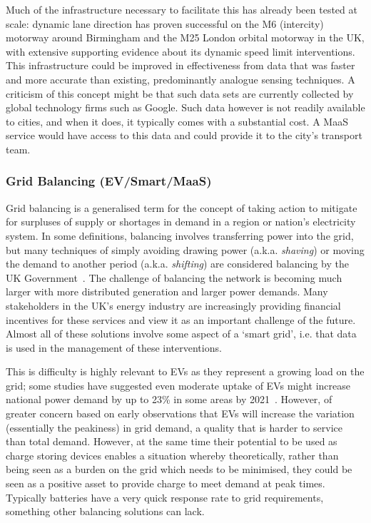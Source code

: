 \documentclass[b5paper,10pt]{article}
\begin{document}
Much of the infrastructure necessary to facilitate this has already
been tested at scale: dynamic lane direction has proven successful on
the M6 (intercity) motorway around Birmingham and the M25 London
orbital motorway in the UK, with extensive supporting evidence about
its dynamic speed limit interventions. This infrastructure could be
improved in effectiveness from data that was faster and more accurate
than existing, predominantly analogue sensing techniques.  A criticism
of this concept might be that such data sets are currently collected
by global technology firms such as Google. Such data however is not
readily available to cities, and when it does, it typically comes with
a substantial cost. A MaaS service would have access to this data and
could provide it to the city's transport team.


\subsubsection{Grid Balancing (EV/Smart/MaaS)} 

Grid balancing is a generalised term for the concept of taking action
to mitigate for surpluses of supply or shortages in demand in a region
or nation’s electricity system. In some definitions, balancing
involves transferring power into the grid, but many techniques of
simply avoiding drawing power (a.k.a. {\emph{shaving}}) or moving the demand
to another period (a.k.a. {\emph{shifting}}) are considered balancing by the
UK Government~\citep{decc:2014}. The challenge of balancing the network
is becoming much larger with more distributed generation and larger
power demands. Many stakeholders in the UK's energy industry are
increasingly providing financial incentives for these services and
view it as an important challenge of the future. Almost all of these
solutions involve some aspect of a `smart grid', i.e. that data is
used in the management of these interventions.

This is difficulty is highly relevant to EVs as they represent a
growing load on the grid; some studies have suggested even moderate
uptake of EVs might increase national power demand by up to 23\% in
some areas by 2021~\citep{paffumi-et-al:2015}. However, of greater
concern based on early observations that EVs will increase the
variation (essentially the peakiness) in grid demand, a quality that
is harder to service than total demand. However, at the same time
their potential to be used as charge storing devices enables a
situation whereby theoretically, rather than being seen as a burden on
the grid which needs to be minimised, they could be seen as a positive
asset to provide charge to meet demand at peak times. Typically
batteries have a very quick response rate to grid requirements,
something other balancing solutions can lack.
\end{document}
